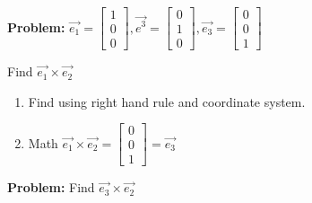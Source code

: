 \documentclass[11pt]{article}
\theoremstyle{plain}
\theoremstyle{remark}
\theoremstyle{plain}
\newcommand{\bd}{\textbf}
\begin{document}
\begin{tcolorbox}[colback=magenta!5!white,colframe=magenta!75!black,title=Example]
    \bd{Problem:} $\overrightarrow{e_1} = \begin{bmatrix}
        1\\0\\0
    \end{bmatrix}, \overrightarrow{e^3}=\begin{bmatrix}
        0\\1\\0
    \end{bmatrix}, \overrightarrow{e_3} = \begin{bmatrix}
        0\\0\\1
    \end{bmatrix}$

    Find $\overrightarrow{e_1}\times\overrightarrow{e_2}$
    \begin{enumerate}
        \item Find using right hand rule and coordinate system.
        \item Math 
        $\overrightarrow{e_1}\times\overrightarrow{e_2} = \begin{bmatrix}
            0\\0\\1
        \end{bmatrix} = \overrightarrow{e_3}$
    \end{enumerate}
\end{tcolorbox}   

\begin{tcolorbox}[colback=magenta!5!white,colframe=magenta!75!black,title=Example]
    \bd{Problem:}
    Find $\overrightarrow{e_3}\times\overrightarrow{e_2}$
    
\end{tcolorbox}   
\end{document}
